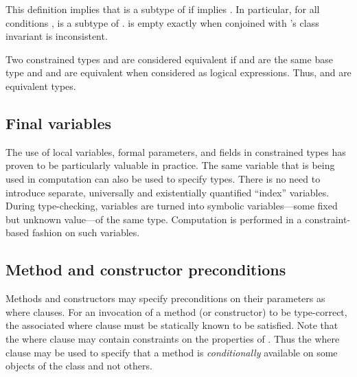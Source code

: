 
This definition 
implies that
 is a subtype of  if  implies .
In particular, for all conditions ,
 is a subtype of .
 is empty exactly
when  conjoined with 's class invariant is inconsistent.

Two constrained types  and  are considered
equivalent if  and  are the same base type and
 and  are equivalent when considered as logical
expressions. Thus,  and  are
equivalent types.

\subsection{Final variables}

The use of  local variables, formal parameters, and
fields in constrained
types has proven to be particularly valuable in practice. The same
variable that is being used in computation can also be used to specify
types. There is no need to introduce separate, universally and
existentially quantified ``index'' variables.
%
During type-checking,  variables are turned into symbolic
variables---some fixed but unknown value---of the same type.
Computation is performed in a constraint-based fashion on such
variables.

\subsection{Method and constructor preconditions}

Methods and constructors may specify preconditions on their parameters
as where clauses.  For an invocation of a method (or constructor) to
be type-correct, the associated where clause must be statically known
to be satisfied. Note that the where clause may contain constraints on
the properties of . Thus the where clause may be used to
specify that a method is {\em conditionally} available on some objects
of the class and not others.

